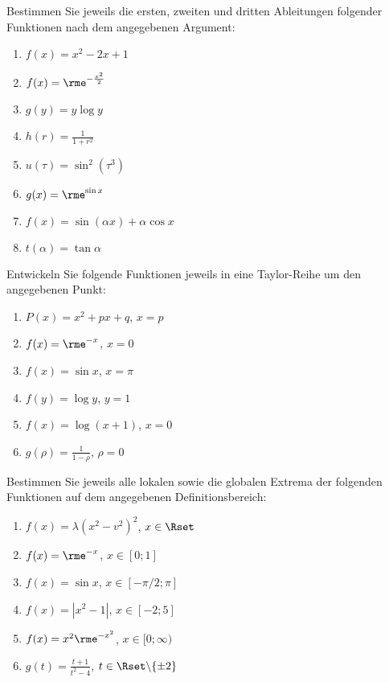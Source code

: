 
Bestimmen Sie jeweils die ersten, zweiten und dritten Ableitungen folgender Funktionen nach dem angegebenen Argument:\\
\parbox{0.5\textwidth}{\begin{enumerate}
\item $f(x)=x^2-2x+1$
\item $f(x)=\rme^{-\frac{x^2}{2}}$
\item $g(y)=y\log y$
\item $h(r)=\frac{1}{1+r^2}$
\end{enumerate}}\parbox{0.5\textwidth}{\begin{enumerate}\setcounter{enumi}{4}
\item $u(\tau)=\sin^2(\tau^3) $
\item $g(x)=\rme^{\sin x}$
\item $f(x)=\sin(\alpha x)+\alpha\cos x$
\item $t(\alpha)=\tan\alpha$
\end{enumerate}}




Entwickeln Sie folgende Funktionen jeweils in eine Taylor-Reihe um den angegebenen Punkt:\\
\parbox{0.5\textwidth}{\begin{enumerate}
\item $P(x)=x^2+px+q$, $x=p$
\item $f(x)=\rme^{-x}$, $x=0$
\item $f(x)=\sin x$, $x=\pi$
\end{enumerate}}\parbox{0.5\textwidth}{\begin{enumerate}\setcounter{enumi}{3}
\item $f(y)=\log y$, $y=1$
\item $f(x)=\log(x+1)$, $x=0$
\item $g(\rho)=\frac{1}{1-\rho}$, $\rho=0$
\end{enumerate}}




Bestimmen Sie jeweils alle lokalen sowie die globalen Extrema der folgenden Funktionen auf dem angegebenen Definitionsbereich:\\
\parbox{0.5\textwidth}{\begin{enumerate}
\item $f(x)=\lambda(x^2-v^2)^2$, $x\in\Rset$
\item $f(x)=\rme^{-x}$, $x\in[0;1]$
\item $f(x)=\sin x$, $x\in [-\pi/2;\pi]$
\end{enumerate}}\parbox{0.5\textwidth}{\begin{enumerate}\setcounter{enumi}{3}
\item $f(x)=|x^2-1|$, $x\in[-2;5]$
\item $f(x)=x^2\rme^{-x^2}$, $x\in[0;\infty)$
\item $g(t)=\frac{t+1}{t^2-4}$, $t\in\Rset\backslash\{\pm 2\}$
\end{enumerate}}

